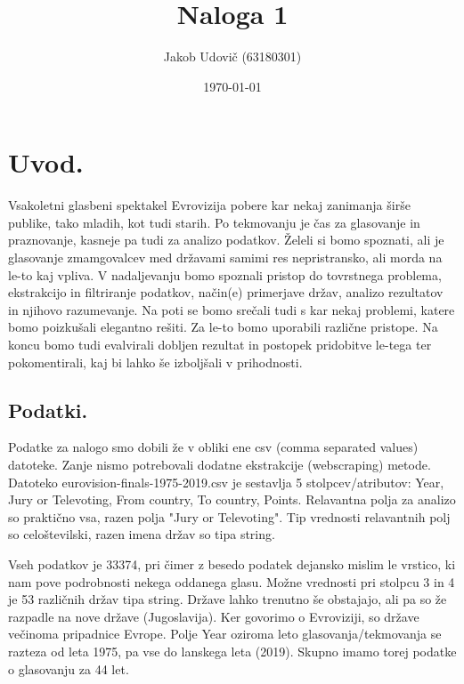 \documentclass[a4paper,11pt]{article}
\title{Naloga 1}
\author{Jakob Udovič (63180301)}
\date{\today}
\begin{document}
\maketitle

\section{Uvod.}
Vsakoletni glasbeni spektakel Evrovizija pobere kar nekaj zanimanja širše publike, tako mladih, kot tudi starih. Po
tekmovanju je čas za glasovanje in praznovanje, kasneje pa tudi za analizo podatkov.
Želeli si bomo spoznati, ali je glasovanje zmamgovalcev med državami samimi res nepristransko, ali morda na le-to kaj vpliva.
V nadaljevanju bomo spoznali pristop do tovrstnega problema, ekstrakcijo in filtriranje podatkov, način(e) primerjave
držav, analizo rezultatov in njihovo razumevanje.
Na poti se bomo srečali tudi s kar nekaj problemi, katere bomo poizkušali elegantno rešiti. Za le-to bomo uporabili različne
pristope. Na koncu bomo tudi evalvirali dobljen rezultat in postopek pridobitve le-tega ter pokomentirali, kaj bi lahko še
izboljšali v prihodnosti.

\subsection{Podatki.}
Podatke za nalogo smo dobili že v obliki ene csv (comma separated values) datoteke. Zanje nismo potrebovali dodatne ekstrakcije
(webscraping) metode.
Datoteko eurovision-finals-1975-2019.csv je sestavlja 5 stolpcev/atributov:
Year, Jury or Televoting, From country, To country, Points.
Relavantna polja za analizo so praktično vsa, razen polja "Jury or Televoting".
Tip vrednosti relavantnih polj so celoštevilski, razen imena držav so tipa string.

Vseh podatkov je 33374, pri čimer z besedo podatek dejansko mislim le vrstico, ki nam pove podrobnosti nekega oddanega glasu.
Možne vrednosti pri stolpcu 3 in 4 je 53 različnih držav tipa string. Države lahko trenutno še obstajajo, ali pa so že
razpadle na nove države (Jugoslavija). Ker govorimo o Evroviziji, so države večinoma pripadnice Evrope.
Polje Year oziroma leto glasovanja/tekmovanja se razteza od leta 1975, pa vse do lanskega leta (2019). Skupno imamo torej
podatke o glasovanju za 44 let.
\end{document}
